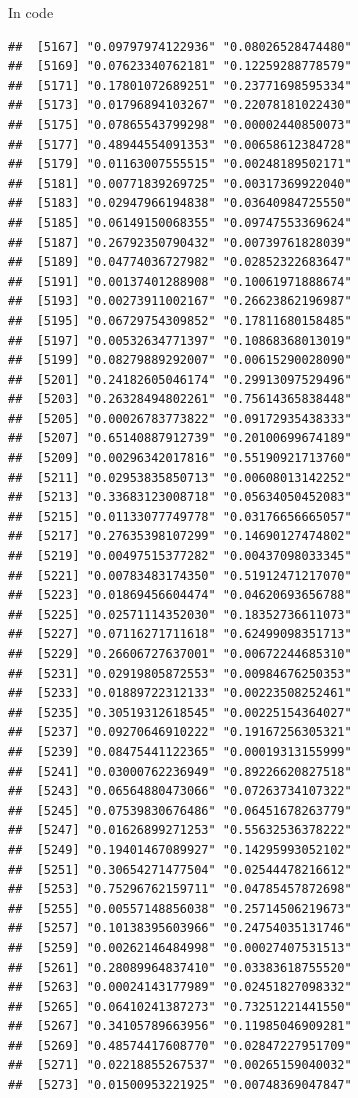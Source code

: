 \documentclass[ignorenonframetext,]{beamer}
\begin{document}
\begin{frame}[fragile]{In code}
\begin{verbatim}
##  [5167] "0.09797974122936" "0.08026528474480"
##  [5169] "0.07623340762181" "0.12259288778579"
##  [5171] "0.17801072689251" "0.23771698595334"
##  [5173] "0.01796894103267" "0.22078181022430"
##  [5175] "0.07865543799298" "0.00002440850073"
##  [5177] "0.48944554091353" "0.00658612384728"
##  [5179] "0.01163007555515" "0.00248189502171"
##  [5181] "0.00771839269725" "0.00317369922040"
##  [5183] "0.02947966194838" "0.03640984725550"
##  [5185] "0.06149150068355" "0.09747553369624"
##  [5187] "0.26792350790432" "0.00739761828039"
##  [5189] "0.04774036727982" "0.02852322683647"
##  [5191] "0.00137401288908" "0.10061971888674"
##  [5193] "0.00273911002167" "0.26623862196987"
##  [5195] "0.06729754309852" "0.17811680158485"
##  [5197] "0.00532634771397" "0.10868368013019"
##  [5199] "0.08279889292007" "0.00615290028090"
##  [5201] "0.24182605046174" "0.29913097529496"
##  [5203] "0.26328494802261" "0.75614365838448"
##  [5205] "0.00026783773822" "0.09172935438333"
##  [5207] "0.65140887912739" "0.20100699674189"
##  [5209] "0.00296342017816" "0.55190921713760"
##  [5211] "0.02953835850713" "0.00608013142252"
##  [5213] "0.33683123008718" "0.05634050452083"
##  [5215] "0.01133077749778" "0.03176656665057"
##  [5217] "0.27635398107299" "0.14690127474802"
##  [5219] "0.00497515377282" "0.00437098033345"
##  [5221] "0.00783483174350" "0.51912471217070"
##  [5223] "0.01869456604474" "0.04620693656788"
##  [5225] "0.02571114352030" "0.18352736611073"
##  [5227] "0.07116271711618" "0.62499098351713"
##  [5229] "0.26606727637001" "0.00672244685310"
##  [5231] "0.02919805872553" "0.00984676250353"
##  [5233] "0.01889722312133" "0.00223508252461"
##  [5235] "0.30519312618545" "0.00225154364027"
##  [5237] "0.09270646910222" "0.19167256305321"
##  [5239] "0.08475441122365" "0.00019313155999"
##  [5241] "0.03000762236949" "0.89226620827518"
##  [5243] "0.06564880473066" "0.07263734107322"
##  [5245] "0.07539830676486" "0.06451678263779"
##  [5247] "0.01626899271253" "0.55632536378222"
##  [5249] "0.19401467089927" "0.14295993052102"
##  [5251] "0.30654271477504" "0.02544478216612"
##  [5253] "0.75296762159711" "0.04785457872698"
##  [5255] "0.00557148856038" "0.25714506219673"
##  [5257] "0.10138395603966" "0.24754035131746"
##  [5259] "0.00262146484998" "0.00027407531513"
##  [5261] "0.28089964837410" "0.03383618755520"
##  [5263] "0.00024143177989" "0.02451827098332"
##  [5265] "0.06410241387273" "0.73251221441550"
##  [5267] "0.34105789663956" "0.11985046909281"
##  [5269] "0.48574417608770" "0.02847227951709"
##  [5271] "0.02218855267537" "0.00265159040032"
##  [5273] "0.01500953221925" "0.00748369047847"

\end{verbatim}
\end{frame}
\end{document}
